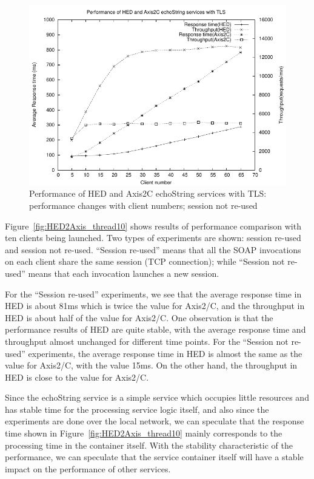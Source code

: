\documentclass[conference]{IEEEtran}
\begin{document}
\begin{figure}
\includegraphics[width=0.9\columnwidth]{TLS_thread_all.pdf}
\caption{Performance of HED and Axis2C echoString services with TLS: performance
changes with client numbers; session not re-used}
\label{fig:TLS_thread_all}
\end{figure}

Figure~\ref{fig:HED2Axis_thread10} shows results of performance comparison with
ten 
clients being launched.
Two types of experiments are shown: session re-used and session not re-used.
``Session re-used'' means that all the SOAP invocations on each client share
the same session (TCP connection); while ``Session not re-used'' means that each invocation
launches a new session.

For the ``Session re-used'' experiments, we see that the average response time
in HED is about 81ms which is twice the value for Axis2/C, and the throughput in HED is about half
of the value for Axis2/C. One observation is that the performance results of HED are quite stable, with
the average response time and throughput almost unchanged for different time points.
For the ``Session not re-used'' experiments, the average response time in HED is
almost the same as the value for Axis2/C, with the value 15ms. On the other hand, the throughput in
HED is close to the value for Axis2/C. 

Since the echoString service is a simple service which occupies little
resources and has stable time for the processing service logic itself, and also since the experiments are done over the local
network, we can speculate that the response time shown in Figure~\ref{fig:HED2Axis_thread10} mainly
corresponds to the processing time in the container itself.
With the stability characteristic of the performance, we can speculate that the
service container itself will have a stable impact on the performance of other services.
\end{document}
